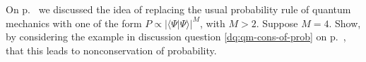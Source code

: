 On p.~\pageref{funky-norm} we discussed the idea of replacing the usual probability
rule of quantum mechanics with one of the form $P \propto |\langle\Psi|\Psi\rangle|^M$,
with $M>2$. Suppose $M=4$. Show, by considering the example in discussion question \ref{dq:qm-cons-of-prob} on p.~\pageref{dq:qm-cons-of-prob},
that this leads to nonconservation of probability.
